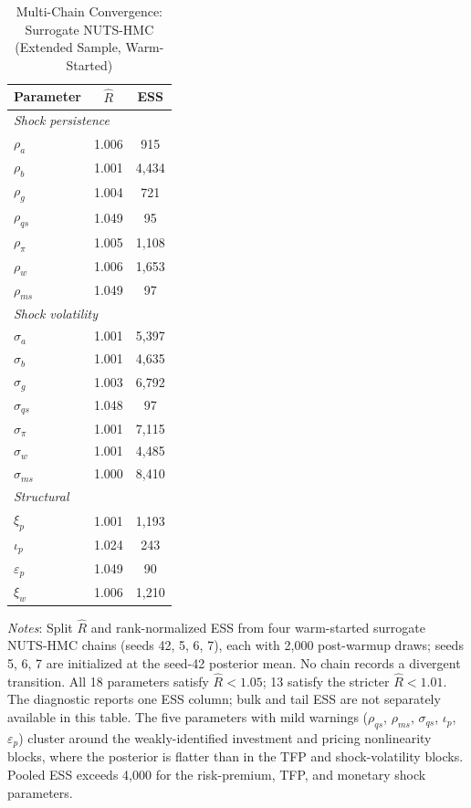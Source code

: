 \documentclass[12pt]{article}
\theoremstyle{plain}
\theoremstyle{definition}
\theoremstyle{remark}
\newcommand{\tablenotes}[1]{%
  \par\vspace{0.5em}%
  \noindent\begin{minipage}{\textwidth}%
  \raggedright\footnotesize #1%
  \end{minipage}\par%
}
\begin{document}
\begin{table}[htbp]
\centering
\caption{Multi-Chain Convergence: Surrogate NUTS-HMC (Extended Sample, Warm-Started)}
\label{tab:rhat_surrogate}
\begin{tabular}{lcc}
\toprule
Parameter & $\hat{R}$ & ESS \\
\midrule
\multicolumn{3}{l}{\textit{Shock persistence}} \\
$\rho_a$ & 1.006 & 915 \\
$\rho_b$ & 1.001 & 4{,}434 \\
$\rho_g$ & 1.004 & 721 \\
$\rho_{qs}$ & 1.049 & 95 \\
$\rho_\pi$ & 1.005 & 1{,}108 \\
$\rho_w$ & 1.006 & 1{,}653 \\
$\rho_{ms}$ & 1.049 & 97 \\
\midrule
\multicolumn{3}{l}{\textit{Shock volatility}} \\
$\sigma_a$ & 1.001 & 5{,}397 \\
$\sigma_b$ & 1.001 & 4{,}635 \\
$\sigma_g$ & 1.003 & 6{,}792 \\
$\sigma_{qs}$ & 1.048 & 97 \\
$\sigma_\pi$ & 1.001 & 7{,}115 \\
$\sigma_w$ & 1.001 & 4{,}485 \\
$\sigma_{ms}$ & 1.000 & 8{,}410 \\
\midrule
\multicolumn{3}{l}{\textit{Structural}} \\
$\xi_p$ & 1.001 & 1{,}193 \\
$\iota_p$ & 1.024 & 243 \\
$\varepsilon_p$ & 1.049 & 90 \\
$\xi_w$ & 1.006 & 1{,}210 \\
\bottomrule
\end{tabular}
\smallskip
\tablenotes{\textit{Notes}: Split $\hat{R}$ \citep{vehtari2021rank} and rank-normalized ESS from four warm-started surrogate NUTS-HMC chains (seeds 42, 5, 6, 7), each with 2{,}000 post-warmup draws; seeds 5, 6, 7 are initialized at the seed-42 posterior mean. No chain records a divergent transition. All 18 parameters satisfy $\hat{R} < 1.05$; 13 satisfy the stricter $\hat{R} < 1.01$. The diagnostic reports one ESS column; bulk and tail ESS are not separately available in this table. The five parameters with mild warnings ($\rho_{qs}$, $\rho_{ms}$, $\sigma_{qs}$, $\iota_p$, $\varepsilon_p$) cluster around the weakly-identified investment and pricing nonlinearity blocks, where the posterior is flatter than in the TFP and shock-volatility blocks. Pooled ESS exceeds 4{,}000 for the risk-premium, TFP, and monetary shock parameters.}
\end{table}
\end{document}

